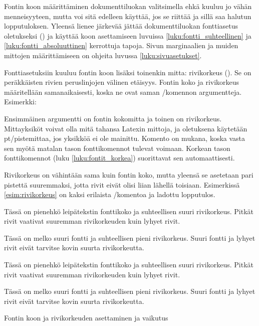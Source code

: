 Fontin koon määrittäminen dokumenttiluokan valitsimella ehkä kuuluu jo
vähän menneisyyteen, mutta voi sitä edelleen käyttää, jos se riittää ja
sillä saa halutun lopputuloksen. Yleensä lienee järkevää jättää
dokumenttiluokan fonttiasetus oletukseksi (\koodi{10pt}) ja käyttää koon
asettamiseen luvuissa \ref{luku:fontti_suhteellinen} ja
\ref{luku:fontti_absoluuttinen} kerrottuja tapoja. Sivun marginaalien ja
muiden mittojen määrittämiseen on ohjeita luvussa
\ref{luku:sivuasetukset}.

Fonttiasetuksiin kuuluu fontin koon lisäksi toinenkin mitta: rivikorkeus
(). Se on peräkkäisten rivien
peruslinjojen välinen etäisyys. Fontin koko ja rivikorkeus määritellään
saman\-aikaisesti, koska ne ovat saman \-/komennon
argumentteja. Esimerkki:

\begin{koodilohkosis}
  \fontsize{10bp}{12bp} \selectfont
\end{koodilohkosis}

Ensimmäinen argumentti on fontin kokomitta ja toinen on rivikorkeus.
Mitta\-yksiköt voivat olla mitä tahansa Latexin mittoja, ja oletuksena
käytetään pt\-/pistemittaa, jos yksikköä ei ole mainittu. Komento
 on mukana, koska vasta sen myötä matalan
tason fonttikomennot tulevat voimaan. Korkean tason fonttikomennot (luku
\ref{luku:fontit_korkea}) suorittavat sen automaattisesti.

Rivikorkeus on vähintään sama kuin fontin koko, mutta yleensä se
asetetaan pari pistettä suuremmaksi, jotta rivit eivät olisi liian
lähellä toisiaan. Esimerkissä \ref{esim:rivikorkeus} on kaksi erilaista
\-/komentoa ja ladottu lopputulos.

\begin{esimerkki*}
\begin{koodilohko}
  \fontsize{8bp}{11bp}\selectfont Tässä on pienehkö leipätekstin
  fonttikoko ja suhteellisen suuri rivikorkeus. Pitkät rivit vaativat
  suuremman rivikorkeuden kuin lyhyet rivit.

  \fontsize{16bp}{17bp}\selectfont Tässä on melko suuri fontti ja
  suhteellisen pieni rivikorkeus. Suuri fontti ja lyhyet rivit eivät
  tarvitse kovin suurta rivikorkeutta.
\end{koodilohko}
\begin{tulos}
  \fontsize{8bp}{11bp}\selectfont Tässä on pienehkö leipätekstin
  fonttikoko ja suhteellisen suuri rivikorkeus. Pitkät rivit vaativat
  suuremman rivikorkeuden kuin lyhyet rivit.

  \fontsize{16bp}{17bp}\selectfont Tässä on melko suuri fontti ja
  suhteellisen pieni rivikorkeus. Suuri fontti ja lyhyet rivit eivät
  tarvitse kovin suurta rivikorkeutta.
\end{tulos}
\caption{Fontin koon ja rivikorkeuden asettaminen ja vaikutus}
\label{esim:rivikorkeus}
\end{esimerkki*}


